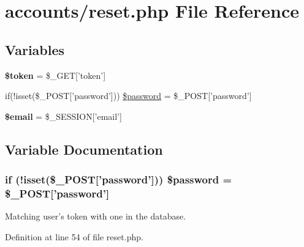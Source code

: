 \hypertarget{reset_8php}{\section{accounts/reset.php File Reference}
\label{reset_8php}
}
\subsection*{Variables}
\begin{DoxyCompactItemize}
\item 
\hypertarget{reset_8php_a00ae4fcafb1145f5e968bdf920f83e2e}{{\bfseries \$token} = \$\-\_\-\-G\-E\-T\mbox{[}'token'\mbox{]}}\label{reset_8php_a00ae4fcafb1145f5e968bdf920f83e2e}

\item 
if(!isset(\$\-\_\-\-P\-O\-S\-T\mbox{[}'password'\mbox{]})) \hyperlink{reset_8php_a7a48941c212d39a017f408470727ff92}{\$password} = \$\-\_\-\-P\-O\-S\-T\mbox{[}'password'\mbox{]}
\item 
\hypertarget{reset_8php_ad634f418b20382e2802f80532d76d3cd}{{\bfseries \$email} = \$\-\_\-\-S\-E\-S\-S\-I\-O\-N\mbox{[}'email'\mbox{]}}\label{reset_8php_ad634f418b20382e2802f80532d76d3cd}

\end{DoxyCompactItemize}


\subsection{Variable Documentation}
\hypertarget{reset_8php_a7a48941c212d39a017f408470727ff92}{
\subsubsection[{\$password}]{\setlength{\rightskip}{0pt plus 5cm}if (!isset(\$\-\_\-\-P\-O\-S\-T\mbox{[}'password'\mbox{]})) \$password = \$\-\_\-\-P\-O\-S\-T\mbox{[}'password'\mbox{]}}}\label{reset_8php_a7a48941c212d39a017f408470727ff92}
Matching user's token with one in the database. 

Definition at line 54 of file reset.\-php.

